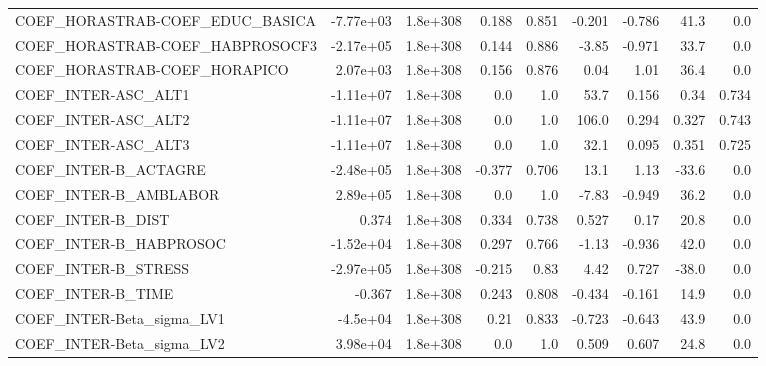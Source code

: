 \begin{tabular}{lrrrrrrrr}
COEF\_HORASTRAB-COEF\_EDUC\_BASICA   &   -7.77e+03 &     1.8e+308 &    0.188 &    0.851 &     -0.201 &      -0.786 &         41.3 &           0.0 \\
COEF\_HORASTRAB-COEF\_HABPROSOCF3   &   -2.17e+05 &     1.8e+308 &    0.144 &    0.886 &      -3.85 &      -0.971 &         33.7 &           0.0 \\
COEF\_HORASTRAB-COEF\_HORAPICO      &    2.07e+03 &     1.8e+308 &    0.156 &    0.876 &       0.04 &        1.01 &         36.4 &           0.0 \\
COEF\_INTER-ASC\_ALT1               &   -1.11e+07 &     1.8e+308 &      0.0 &      1.0 &       53.7 &       0.156 &         0.34 &         0.734 \\
COEF\_INTER-ASC\_ALT2               &   -1.11e+07 &     1.8e+308 &      0.0 &      1.0 &      106.0 &       0.294 &        0.327 &         0.743 \\
COEF\_INTER-ASC\_ALT3               &   -1.11e+07 &     1.8e+308 &      0.0 &      1.0 &       32.1 &       0.095 &        0.351 &         0.725 \\
COEF\_INTER-B\_ACTAGRE              &   -2.48e+05 &     1.8e+308 &   -0.377 &    0.706 &       13.1 &        1.13 &        -33.6 &           0.0 \\
COEF\_INTER-B\_AMBLABOR             &    2.89e+05 &     1.8e+308 &      0.0 &      1.0 &      -7.83 &      -0.949 &         36.2 &           0.0 \\
COEF\_INTER-B\_DIST                 &       0.374 &     1.8e+308 &    0.334 &    0.738 &      0.527 &        0.17 &         20.8 &           0.0 \\
COEF\_INTER-B\_HABPROSOC            &   -1.52e+04 &     1.8e+308 &    0.297 &    0.766 &      -1.13 &      -0.936 &         42.0 &           0.0 \\
COEF\_INTER-B\_STRESS               &   -2.97e+05 &     1.8e+308 &   -0.215 &     0.83 &       4.42 &       0.727 &        -38.0 &           0.0 \\
COEF\_INTER-B\_TIME                 &      -0.367 &     1.8e+308 &    0.243 &    0.808 &     -0.434 &      -0.161 &         14.9 &           0.0 \\
COEF\_INTER-Beta\_sigma\_LV1         &    -4.5e+04 &     1.8e+308 &     0.21 &    0.833 &     -0.723 &      -0.643 &         43.9 &           0.0 \\
COEF\_INTER-Beta\_sigma\_LV2         &    3.98e+04 &     1.8e+308 &      0.0 &      1.0 &      0.509 &       0.607 &         24.8 &           0.0 \\

\end{tabular}

